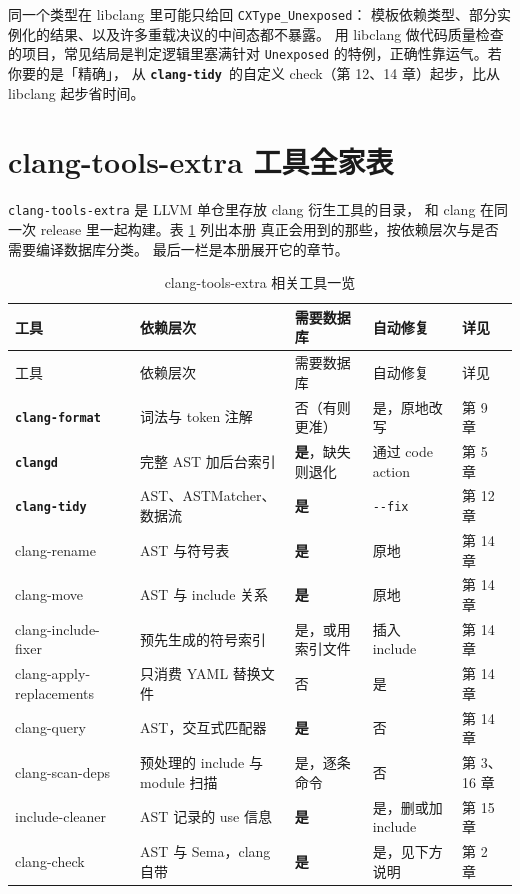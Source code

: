 \documentclass[12pt,a4paper,fontset=fandol]{ctexbook}
\newcommand{\Opt}[1]{\texttt{-\/-#1}}
\newcommand{\Lib}[1]{\textbf{\texttt{#1}}}
\newcommand{\Tidy}{\Lib{clang-tidy}}
\newcommand{\Fmt}{\Lib{clang-format}}
\newcommand{\CD}{\Lib{clangd}}
\begin{document}
\begin{warning}[title={libclang 不是 clang 的轻量版，而是另一套语义视图}]
同一个类型在 libclang 里可能只给回 \texttt{CXType\_Unexposed}：
模板依赖类型、部分实例化的结果、以及许多重载决议的中间态都不暴露。
用 libclang 做代码质量检查的项目，常见结局是判定逻辑里塞满针对
\texttt{Unexposed} 的特例，正确性靠运气。若你要的是「精确」，
从 \Tidy\ 的自定义 check（第 12、14 章）起步，比从 libclang 起步省时间。
\end{warning}

\section{clang-tools-extra 工具全家表}
\label{sec:ch01-s4}

\texttt{clang-tools-extra} 是 LLVM 单仓里存放 clang 衍生工具的目录，
和 clang 在同一次 release 里一起构建。表 \ref{tab:ch01-tools} 列出本册
真正会用到的那些，按依赖层次与是否需要编译数据库分类。
最后一栏是本册展开它的章节。

\begin{longtable}{@{}>{\raggedright\arraybackslash\small}p{}
                 >{\raggedright\arraybackslash\small}p{}
                 >{\raggedright\arraybackslash\small}p{}
                 >{\raggedright\arraybackslash\small}p{}
                 >{\raggedright\arraybackslash\small}p{}@{}}
\caption{clang-tools-extra 相关工具一览}\label{tab:ch01-tools} \\
\toprule
工具 & 依赖层次 & 需要数据库 & 自动修复 & 详见 \\
\midrule
\endfirsthead
\toprule
工具 & 依赖层次 & 需要数据库 & 自动修复 & 详见 \\
\midrule
\endhead
\Fmt &
  词法与 token 注解 & 否（有则更准） & 是，原地改写 & 第 9 章 \\
\CD &
  完整 AST 加后台索引 & \textbf{是}，缺失则退化 & 通过 code action & 第 5 章 \\
\Tidy &
  AST、ASTMatcher、数据流 & \textbf{是} & \Opt{fix} & 第 12 章 \\
clang-rename &
  AST 与符号表 & \textbf{是} & 原地 & 第 14 章 \\
clang-move &
  AST 与 include 关系 & \textbf{是} & 原地 & 第 14 章 \\
clang-include-fixer &
  预先生成的符号索引 & 是，或用索引文件 & 插入 include & 第 14 章 \\
clang-apply-replacements &
  只消费 YAML 替换文件 & 否 & 是 & 第 14 章 \\
clang-query &
  AST，交互式匹配器 & \textbf{是} & 否 & 第 14 章 \\
clang-scan-deps &
  预处理的 include 与 module 扫描 & 是，逐条命令 & 否 & 第 3、16 章 \\
include-cleaner &
  AST 记录的 use 信息 & \textbf{是} & 是，删或加 include & 第 15 章 \\
clang-check &
  AST 与 Sema，clang 自带 & \textbf{是} & 是，见下方说明 & 第 2 章 \\
\bottomrule
\end{longtable}
\end{document}
